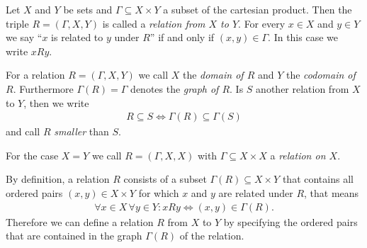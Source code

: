 \begin{definition}
    Let $X$ and $Y$ be sets and $\Gamma\subseteq X\times Y$ a subset of the cartesian product. Then the triple $R=(\Gamma,X,Y)$ is called a \emph{relation from $X$ to $Y$}. For every $x\in X$ and $y\in Y$ we say \enquote{$x$ is related to $y$ under $R$} if and only if $(x,y)\in\Gamma$. In this case we write $x R y$.

    For a relation $R=(\Gamma,X,Y)$ we call $X$ the \emph{domain of $R$} and $Y$ the \emph{codomain of $R$}. Furthermore $\Gamma(R)=\Gamma$ denotes the \emph{graph of $R$}. Is $S$ another relation from $X$ to $Y$, then we write \begin{align}R\subseteq S\iff\Gamma(R)\subseteq\Gamma(S)\end{align} and call $R$ \emph{smaller} than $S$.

    For the case $X=Y$ we call $R=(\Gamma,X,X)$ with $\Gamma\subseteq X\times X$ a \emph{relation on $X$}.
\end{definition}

By definition, a relation $R$ consists of a subset $\Gamma(R)\subseteq X\times Y$ that contains all ordered pairs $(x,y)\in X\times Y$ for which $x$ and $y$ are related under $R$, that means
\begin{align}\forall x\in X\,\forall y\in Y\colon xRy\Leftrightarrow (x,y)\in \Gamma(R).\end{align}
Therefore we can define a relation $R$ from $X$ to $Y$ by specifying the ordered pairs that are contained in the graph $\Gamma(R)$ of the relation.

